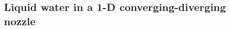 \documentclass[preprint,10pt]{elsarticle}
\newcommand{\tcr}[1]{\textcolor{red}{#1}}
\begin{document}

\subsection{Liquid water in a 1-D converging-diverging nozzle} \label{sec:liquid_nozzle}
\end{document}
